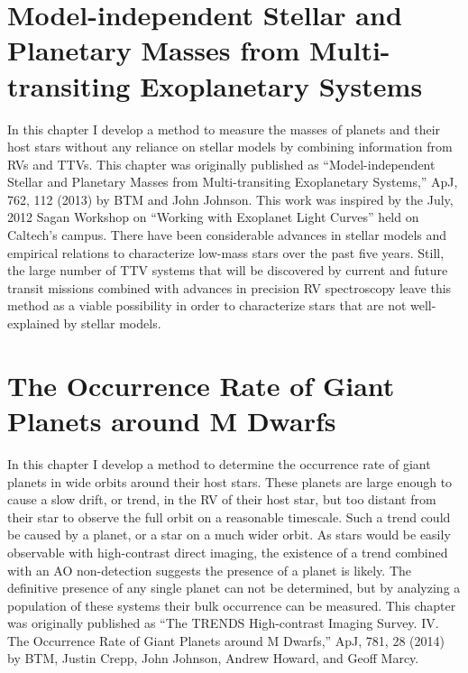 \documentclass[12pt]{caltech_thesis}
\begin{document}
\chapter{Model-independent Stellar and Planetary Masses from Multi-transiting Exoplanetary Systems}
\label{chap:ttvs}

In this chapter I develop a method to measure the masses of planets and their host stars
without any reliance on stellar models by combining information from RVs and TTVs. 
This chapter was originally published as ``Model-independent Stellar and Planetary Masses from Multi-transiting Exoplanetary Systems,'' ApJ, 762, 112 (2013) by BTM and 
John Johnson. This work was inspired by the July, 2012 Sagan Workshop on ``Working with
Exoplanet Light Curves'' held on Caltech's campus.
There have been considerable advances in stellar models and
empirical relations to characterize low-mass stars over the past five years.
Still,
the large number of TTV systems that will be discovered by current and future transit
missions combined with advances in precision RV spectroscopy leave this method as a viable
possibility in order to characterize stars that are not well-explained by stellar models.






\chapter{The Occurrence Rate of Giant Planets around M Dwarfs}
\label{chap:trends}

In this chapter I develop a method to determine the occurrence
rate of giant planets in wide orbits around their host stars.
These planets are large enough to cause a slow drift, or trend, in 
the RV of their host star, but too distant from their star to
observe the full orbit on a reasonable timescale.
Such a trend could be caused by a planet, or a star on a much
wider orbit. As stars would be easily observable with high-contrast
direct imaging, the existence of a trend combined with an AO 
non-detection suggests the presence of a planet is likely.
The definitive presence of any single planet can not be 
determined, but by analyzing a population of these systems their
bulk occurrence can be measured.
This chapter was originally published as ``The TRENDS High-contrast Imaging Survey. IV. The Occurrence Rate of Giant Planets around M Dwarfs,'' ApJ, 781, 28 (2014) by BTM, Justin Crepp, John Johnson,
Andrew Howard, and Geoff Marcy. 
\end{document}
